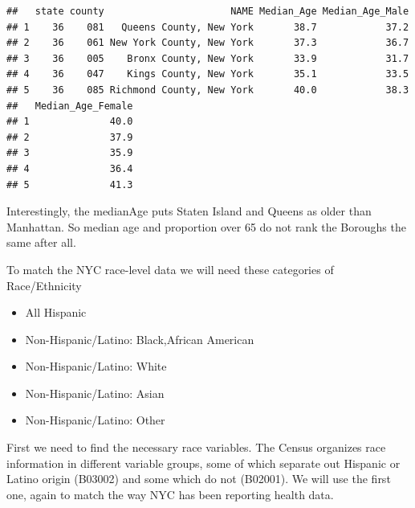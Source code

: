 \documentclass[
  openany]{book}
\newenvironment{Shaded}{\begin{snugshade}}{\end{snugshade}}
\newcommand{\AttributeTok}[1]{\textcolor[rgb]{0.77,0.63,0.00}{#1}}
\newcommand{\DecValTok}[1]{\textcolor[rgb]{0.00,0.00,0.81}{#1}}
\newcommand{\FunctionTok}[1]{\textcolor[rgb]{0.00,0.00,0.00}{#1}}
\newcommand{\NormalTok}[1]{#1}
\newcommand{\OtherTok}[1]{\textcolor[rgb]{0.56,0.35,0.01}{#1}}
\newcommand{\SpecialCharTok}[1]{\textcolor[rgb]{0.00,0.00,0.00}{#1}}
\newcommand{\StringTok}[1]{\textcolor[rgb]{0.31,0.60,0.02}{#1}}
\providecommand{\tightlist}{%
  \setlength{\itemsep}{0pt}\setlength{\parskip}{0pt}}
\begin{document}
\begin{verbatim}
##   state county                      NAME Median_Age Median_Age_Male
## 1    36    081   Queens County, New York       38.7            37.2
## 2    36    061 New York County, New York       37.3            36.7
## 3    36    005    Bronx County, New York       33.9            31.7
## 4    36    047    Kings County, New York       35.1            33.5
## 5    36    085 Richmond County, New York       40.0            38.3
##   Median_Age_Female
## 1              40.0
## 2              37.9
## 3              35.9
## 4              36.4
## 5              41.3
\end{verbatim}

Interestingly, the medianAge puts Staten Island and Queens as older than Manhattan. So median age and proportion over 65 do not rank the Boroughs the same after all.

To match the NYC race-level data we will need these categories of Race/Ethnicity

\begin{itemize}
\tightlist
\item
  All Hispanic
\item
  Non-Hispanic/Latino: Black,African American
\item
  Non-Hispanic/Latino: White
\item
  Non-Hispanic/Latino: Asian
\item
  Non-Hispanic/Latino: Other
\end{itemize}

First we need to find the necessary race variables. The Census organizes race information in different variable groups, some of which separate out Hispanic or Latino origin (B03002) and some which do not (B02001). We will use the first one, again to match the way NYC has been reporting health data.

\begin{Shaded}
\end{Shaded}
\end{document}
